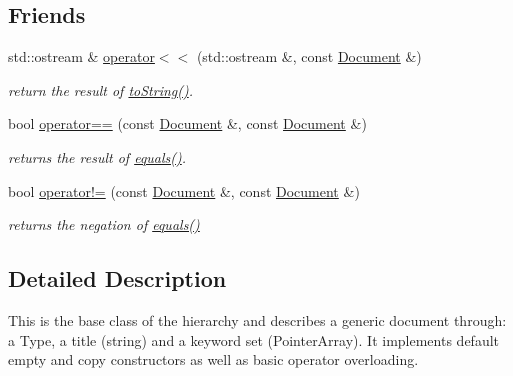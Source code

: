 \subsection*{Friends}
\begin{DoxyCompactItemize}
\item 
std\-::ostream \& \hyperlink{classdocs_1_1Document_a801e6c851261e550881c632d31407c55}{operator$<$$<$} (std\-::ostream \&, const \hyperlink{classdocs_1_1Document}{Document} \&)
\begin{DoxyCompactList}\small\item\em return the result of \hyperlink{classdocs_1_1Document_a16db383045038b779eb489ad125ef02b}{to\-String()}. \end{DoxyCompactList}\item 
bool \hyperlink{classdocs_1_1Document_aba6a95005cddfc7e9b668de3b0160cc6}{operator==} (const \hyperlink{classdocs_1_1Document}{Document} \&, const \hyperlink{classdocs_1_1Document}{Document} \&)
\begin{DoxyCompactList}\small\item\em returns the result of \hyperlink{classdocs_1_1Document_ad86b3a7c7d496f3b05c740e2c1433c78}{equals()}. \end{DoxyCompactList}\item 
bool \hyperlink{classdocs_1_1Document_abda12a8e6c13277b760c0e40efa44695}{operator!=} (const \hyperlink{classdocs_1_1Document}{Document} \&, const \hyperlink{classdocs_1_1Document}{Document} \&)
\begin{DoxyCompactList}\small\item\em returns the negation of \hyperlink{classdocs_1_1Document_ad86b3a7c7d496f3b05c740e2c1433c78}{equals()} \end{DoxyCompactList}\end{DoxyCompactItemize}


\subsection{Detailed Description}
This is the base class of the hierarchy and describes a generic document through\-: a Type, a title (string) and a keyword set (Pointer\-Array). It implements default empty and copy constructors as well as basic operator overloading. 

